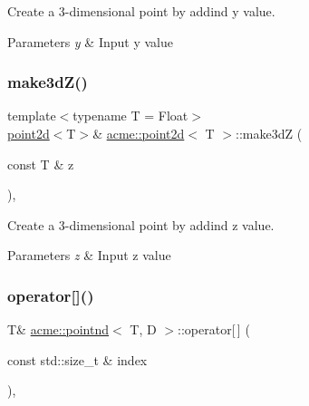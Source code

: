 Create a 3-\/dimensional point by addind y value. 


\begin{DoxyParams}{Parameters}
{\em y} & Input y value \\
\hline
\end{DoxyParams}
\mbox{\label{classacme_1_1point2d_a605f4d335747c08026316ec4982b7eb5}} 
\subsubsection{\texorpdfstring{make3d\+Z()}{make3dZ()}}
{\footnotesize\ttfamily template$<$typename T = Float$>$ \\
\hyperlink{classacme_1_1point2d}{point2d}$<$T$>$\& \hyperlink{classacme_1_1point2d}{acme\+::point2d}$<$ T $>$\+::make3dZ (\begin{DoxyParamCaption}\item[{const T \&}]{z }\end{DoxyParamCaption})\hspace{0.3cm}{\ttfamily [inline]}, {\ttfamily [inherited]}}



Create a 3-\/dimensional point by addind z value. 


\begin{DoxyParams}{Parameters}
{\em z} & Input z value \\
\hline
\end{DoxyParams}
\mbox{\label{classacme_1_1pointnd_a35b0691673728d98d455c007612d6b91}} 
\subsubsection{\texorpdfstring{operator[]()}{operator[]()}\hspace{0.1cm}{\footnotesize\ttfamily [1/2]}}
{\footnotesize\ttfamily T\& \hyperlink{classacme_1_1pointnd}{acme\+::pointnd}$<$ T, D $>$\+::operator\mbox{[}$\,$\mbox{]} (\begin{DoxyParamCaption}\item[{const std\+::size\+\_\+t \&}]{index }\end{DoxyParamCaption})\hspace{0.3cm}{\ttfamily [inline]}, {\ttfamily [inherited]}}



